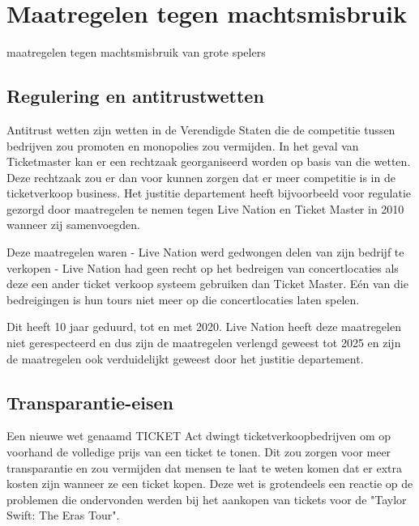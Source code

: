 
\section{Maatregelen tegen machtsmisbruik}

maatregelen tegen machtsmisbruik van grote spelers

\subsection{Regulering en antitrustwetten}

Antitrust wetten zijn wetten in de Verendigde Staten die de competitie tussen bedrijven zou promoten en monopolies
zou vermijden. In het geval van Ticketmaster kan er een rechtzaak georganiseerd worden op basis van die wetten.
Deze rechtzaak zou er dan voor kunnen zorgen dat er meer competitie is in de ticketverkoop business. 
Het justitie departement heeft bijvoorbeeld voor regulatie gezorgd door maatregelen te nemen tegen 
Live Nation en Ticket Master in 2010 wanneer zij samenvoegden.
 
Deze maatregelen waren
- Live Nation werd gedwongen delen van zijn bedrijf te verkopen
- Live Nation had geen recht op het bedreigen van concertlocaties als deze een ander ticket verkoop systeem gebruiken dan 
  Ticket Master. Eén van die bedreigingen is hun tours niet meer op die concertlocaties laten spelen.   

Dit heeft 10 jaar geduurd, tot en met 2020. Live Nation heeft deze maatregelen niet gerespecteerd en dus zijn de 
maatregelen verlengd geweest tot 2025 en zijn de maatregelen ook verduidelijkt geweest door het justitie departement.


\subsection{Transparantie-eisen}

Een nieuwe wet genaamd TICKET Act dwingt ticketverkoopbedrijven om op voorhand de volledige prijs van een ticket
te tonen. Dit zou zorgen voor meer transparantie en zou vermijden dat mensen te laat te weten komen dat er extra 
kosten zijn wanneer ze een ticket kopen. Deze wet is grotendeels een reactie op de problemen die ondervonden werden
bij het aankopen van tickets voor de "Taylor Swift: The Eras Tour".


